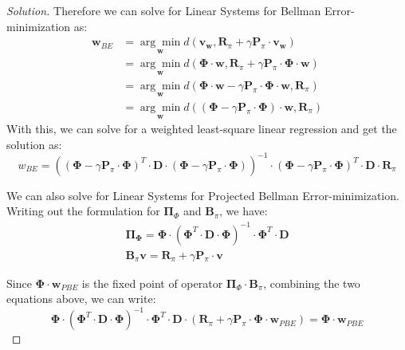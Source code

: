 \documentclass[12pt]{article}
\newenvironment{solution}
  {\renewcommand\qedsymbol{$\blacksquare$}\begin{proof}[Solution]}
  {\end{proof}}
\begin{document}
\begin{solution}
Therefore we can solve for Linear Systems for Bellman Error-minimization as:
\begin{equation}
\begin{aligned}
\mathbf{w}_{B E} &=\underset{\mathbf{w}}{\arg \min } d\left(\mathbf{v}_{\mathbf{w}}, \mathbf{R}_{\pi}+\gamma \mathbf{P}_{\pi} \cdot \mathbf{v}_{\mathbf{w}}\right) \\
&=\underset{\mathbf{w}}{\arg \min } d\left(\mathbf{\Phi} \cdot \mathbf{w}, \mathbf{R}_{\pi}+\gamma \mathbf{P}_{\pi} \cdot \mathbf{\Phi} \cdot \mathbf{w}\right) \\
&=\underset{\mathbf{w}}{\arg \min } d\left(\mathbf{\Phi} \cdot \mathbf{w}-\gamma \mathbf{P}_{\pi} \cdot \mathbf{\Phi} \cdot \mathbf{w}, \mathbf{R}_{\pi}\right) \\
&=\underset{\mathbf{w}}{\arg \min } d\left(\left(\mathbf{\Phi}-\gamma \mathbf{P}_{\pi} \cdot \mathbf{\Phi}\right) \cdot \mathbf{w}, \mathbf{R}_{\pi}\right)
\end{aligned}
\end{equation}
With this, we can solve for a weighted least-square linear regression and get the solution as:
\begin{equation}
w_{B E}=\left(\left(\boldsymbol{\Phi}-\gamma \mathbf{P}_{\pi} \cdot \boldsymbol{\Phi}\right)^{T} \cdot \mathbf{D} \cdot\left(\boldsymbol{\Phi}-\gamma \mathbf{P}_{\pi} \cdot \boldsymbol{\Phi}\right)\right)^{-1} \cdot\left(\boldsymbol{\Phi}-\gamma \mathbf{P}_{\pi} \cdot \boldsymbol{\Phi}\right)^{T} \cdot \mathbf{D} \cdot \mathbf{R}_{\pi}
\end{equation}

We can also solve for Linear Systems for Projected Bellman Error-minimization. Writing out the formulation for $\mathbf{\Pi}_{\Phi}$ and $\mathbf{B}_{\pi}$, we have:
\begin{align}
\mathbf{\Pi}_{\boldsymbol{\Phi}}=\boldsymbol{\Phi} \cdot\left(\boldsymbol{\Phi}^{T} \cdot \mathbf{D} \cdot \boldsymbol{\Phi}\right)^{-1} \cdot \boldsymbol{\Phi}^{T} \cdot \mathbf{D} \\
\mathbf{B}_{\pi} \mathbf{v}=\mathbf{R}_{\pi}+\gamma \mathbf{P}_{\pi} \cdot \mathbf{v}
\end{align}

Since $\mathbf{\Phi} \cdot \mathbf{w}_{P B E}$ is the fixed point of operator $\mathbf{\Pi}_{\Phi} \cdot \mathbf{B}_{\pi}$, combining the two equations above, we can write:
\begin{equation}
	\boldsymbol{\Phi} \cdot\left(\boldsymbol{\Phi}^{T} \cdot \mathbf{D} \cdot \boldsymbol{\Phi}\right)^{-1} \cdot \boldsymbol{\Phi}^{T} \cdot \mathbf{D} \cdot\left(\mathbf{R}_{\pi}+\gamma \mathbf{P}_{\pi} \cdot \boldsymbol{\Phi} \cdot \mathbf{w}_{P B E}\right)=\boldsymbol{\Phi} \cdot \mathbf{w}_{P B E}
\end{equation}


\end{solution}
\end{document}
